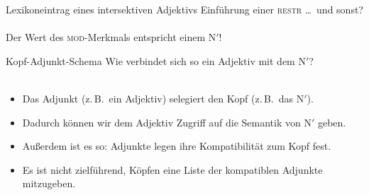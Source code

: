\begin{frame}
  {Lexikoneintrag eines intersektiven Adjektivs}
  \onslide<+->
  \onslide<+->
  Einführung einer \textsc{restr} \ldots\ und sonst?\\
  \onslide<+->
  \Halbzeile
  \centering 
  \\
  \Halbzeile
  \alert{Der Wert des \textsc{mod}-Merkmals entspricht einem N$'$!}
\end{frame}

\begin{frame}
  {Kopf-Adjunkt-Schema}
  \onslide<+->
  \onslide<+->
  Wie verbindet sich so ein Adjektiv mit dem N$'$?\\
  \onslide<+->
  \Zeile
  \centering 
   \\
  \Zeile
  \begin{itemize}[<+->]
    \item Das \alert{Adjunkt (z.\,B.\ ein Adjektiv) selegiert den Kopf (z.\,B.\ das N$'$)}.
    \item Dadurch können wir dem Adjektiv Zugriff auf die Semantik von N$'$ geben.
    \item Außerdem ist es so: Adjunkte legen ihre Kompatibilität zum Kopf fest.
    \item Es ist nicht zielführend, Köpfen eine Liste der kompatiblen Adjunkte mitzugeben.
  \end{itemize}
\end{frame}

